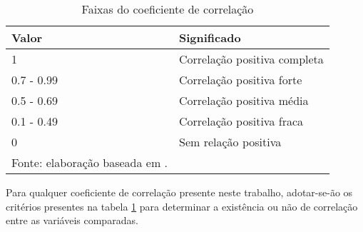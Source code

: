 \begin{table}[]
\caption{Faixas do coeficiente de correlação}
\begin{tabular}{@{}ll@{}}
\toprule
Valor      & Significado                  \\ \midrule
1          & Correlação positiva completa \\ \midrule
0.7 - 0.99 & Correlação positiva forte    \\ \midrule
0.5 - 0.69 & Correlação positiva média    \\ \midrule
0.1 - 0.49 & Correlação positiva fraca    \\ \midrule
0          & Sem relação positiva  \\ \midrule      
\label{tab:faixas-coeficiente-correlacao}
\footnotesize{Fonte: elaboração baseada em \cite{ali2022spearman}.}  
\end{tabular}
\end{table}

Para qualquer coeficiente de correlação presente neste trabalho, adotar-se-ão os critérios presentes na tabela \ref{tab:faixas-coeficiente-correlacao} para determinar a existência ou não de correlação entre as variáveis comparadas.